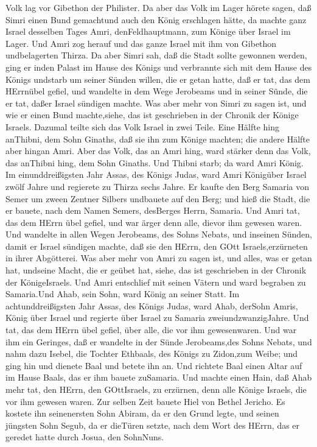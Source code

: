 Volk lag vor Gibethon der Philister.  Da aber das Volk im
Lager hörete sagen, daß Simri einen Bund gemachtund auch den König
erschlagen hätte, da machte ganz Israel desselben Tages Amri,
denFeldhauptmann, zum Könige über Israel im Lager.  Und
Amri zog herauf und das ganze Israel mit ihm von Gibethon undbelagerten
Thirza.  Da aber Simri sah, daß die Stadt sollte gewonnen
werden, ging er inden Palast im Hause des Königs und verbrannte sich mit
dem Hause des Königs undstarb  um seiner Sünden willen, die
er getan hatte, daß er tat, das dem HErrnübel gefiel, und wandelte in
dem Wege Jerobeams und in seiner Sünde, die er tat, daßer Israel
sündigen machte.  Was aber mehr von Simri zu sagen ist, und
wie er einen Bund machte,siehe, das ist geschrieben in der Chronik der
Könige Israels.  Dazumal teilte sich das Volk Israel in
zwei Teile. Eine Hälfte hing anThibni, dem Sohn Ginaths, daß sie ihn zum
Könige machten; die andere Hälfte aber hingan Amri.  Aber
das Volk, das an Amri hing, ward stärker denn das Volk, das anThibni
hing, dem Sohn Ginaths. Und Thibni starb; da ward Amri König.
 Im einunddreißigsten Jahr Assas, des Königs Judas, ward
Amri Königüber Israel zwölf Jahre und regierete zu Thirza sechs Jahre.
 Er kaufte den Berg Samaria von Semer um zween Zentner
Silbers undbauete auf den Berg; und hieß die Stadt, die er bauete, nach
dem Namen Semers, desBerges Herrn, Samaria.  Und Amri tat,
das dem HErrn übel gefiel, und war ärger denn alle, dievor ihm gewesen
waren.  Und wandelte in allen Wegen Jerobeams, des Sohns
Nebats, und inseinen Sünden, damit er Israel sündigen machte, daß sie
den HErrn, den GOtt Israels,erzürneten in ihrer Abgötterei.
 Was aber mehr von Amri zu sagen ist, und alles, was er
getan hat, undseine Macht, die er geübet hat, siehe, das ist geschrieben
in der Chronik der KönigeIsraels.  Und Amri entschlief mit
seinen Vätern und ward begraben zu Samaria.Und Ahab, sein Sohn, ward
König an seiner Statt.  Im achtunddreißigsten Jahr Assas,
des Königs Judas, ward Ahab, derSohn Amris, König über Israel und
regierte über Israel zu Samaria zweiundzwanzigJahre.  Und
tat, das dem HErrn übel gefiel, über alle, die vor ihm gewesenwaren.
 Und war ihm ein Geringes, daß er wandelte in der Sünde
Jerobeams,des Sohns Nebats, und nahm dazu Isebel, die Tochter Ethbaals,
des Königs zu Zidon,zum Weibe; und ging hin und dienete Baal und betete
ihn an.  Und richtete Baal einen Altar auf im Hause Baals,
das er ihm bauete zuSamaria.  Und machte einen Hain, daß
Ahab mehr tat, den HErrn, den GOttIsraels, zu erzürnen, denn alle Könige
Israels, die vor ihm gewesen waren.  Zur selben Zeit bauete
Hiel von Bethel Jericho. Es kostete ihn seinenersten Sohn Abiram, da er
den Grund legte, und seinen jüngsten Sohn Segub, da er dieTüren setzte,
nach dem Wort des HErrn, das er geredet hatte durch Josua, den SohnNuns.

